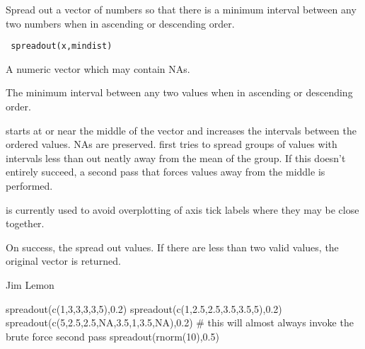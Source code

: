 \begin{Description}\relax
Spread out a vector of numbers so that there is a minimum interval
between any two numbers when in ascending or descending order.
\end{Description}
\begin{Usage}
\begin{verbatim}
 spreadout(x,mindist)
\end{verbatim}
\end{Usage}
\begin{Arguments}
\begin{ldescription}
\item[\code{x}] A numeric vector which may contain NAs.
\item[\code{mindist}] The minimum interval between any two values when in ascending
or descending order.
\end{ldescription}
\end{Arguments}
\begin{Details}\relax
{} starts at or near the middle of the vector and increases the
intervals between the ordered values. NAs are preserved. 
first tries to spread groups of values with intervals less than 
out neatly away from the mean of the group. If this doesn't entirely succeed,
a second pass that forces values away from the middle is performed.

 is currently used to avoid overplotting of axis tick labels
where they may be close together.
\end{Details}
\begin{Value}
On success, the spread out values. If there are less than two valid
values, the original vector is returned.
\end{Value}
\begin{Author}\relax
Jim Lemon
\end{Author}
\begin{Examples}
\begin{ExampleCode}
 spreadout(c(1,3,3,3,3,5),0.2)
 spreadout(c(1,2.5,2.5,3.5,3.5,5),0.2)
 spreadout(c(5,2.5,2.5,NA,3.5,1,3.5,NA),0.2)
 # this will almost always invoke the brute force second pass
 spreadout(rnorm(10),0.5)
\end{ExampleCode}
\end{Examples}

